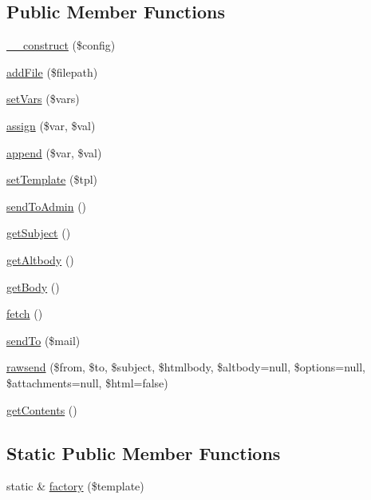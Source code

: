 \subsection*{Public Member Functions}
\begin{CompactItemize}
\item 
\hyperlink{classMail_a5f231a848f2ccebb489d067a3df64d4}{\_\-\_\-construct} (\$config)
\item 
\hyperlink{classMail_a549ce1e7def00b0879bcaf3b8855e4a}{addFile} (\$filepath)
\item 
\hyperlink{classMail_d6c0374d8c7e8652abe5ab62ba66e43c}{setVars} (\$vars)
\item 
\hyperlink{classMail_a3b066baef0428c4647d53adcc4f7db1}{assign} (\$var, \$val)
\item 
\hyperlink{classMail_ba85602bb95d1882d965bda635ef6ffe}{append} (\$var, \$val)
\item 
\hyperlink{classMail_b346333471800d919fcf8723a92cf2f3}{setTemplate} (\$tpl)
\item 
\hyperlink{classMail_8b994926a2e68fcd287af87072b9206b}{sendToAdmin} ()
\item 
\hyperlink{classMail_e589342450d2ef29194a98d78aa8aa21}{getSubject} ()
\item 
\hyperlink{classMail_369216eb8e8fdfbceb2f4d5285c715dc}{getAltbody} ()
\item 
\hyperlink{classMail_0b2b69dcc89ad08a475e7a53911b8dbf}{getBody} ()
\item 
\hyperlink{classMail_a8546c9659939683d8fe174190a8e374}{fetch} ()
\item 
\hyperlink{classMail_1a876548e9e9a29126959597a21e7c4a}{sendTo} (\$mail)
\item 
\hyperlink{classMail_7cc8cfd426c352b3f61d0c792551481f}{rawsend} (\$from, \$to, \$subject, \$htmlbody, \$altbody=null, \$options=null, \$attachments=null, \$html=false)
\item 
\hyperlink{classMail_54871f85d58e55c51c7791b7770c9b53}{getContents} ()
\end{CompactItemize}
\subsection*{Static Public Member Functions}
\begin{CompactItemize}
\item 
static \& \hyperlink{classMail_add43d8b5b8631aa3822123ea4ab201f}{factory} (\$template)
\end{CompactItemize}


